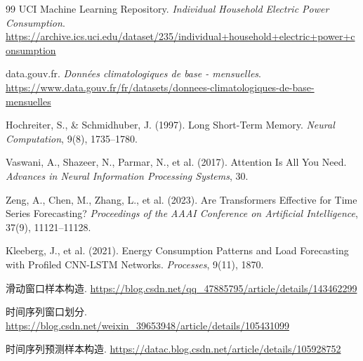 \documentclass[UTF8,a4paper,12pt]{ctexart}
\begin{document}
\begin{thebibliography}{99}
UCI Machine Learning Repository.
\textit{Individual Household Electric Power Consumption}.
\url{https://archive.ics.uci.edu/dataset/235/individual+household+electric+power+consumption}

data.gouv.fr.
\textit{Données climatologiques de base - mensuelles}.
\url{https://www.data.gouv.fr/fr/datasets/donnees-climatologiques-de-base-mensuelles}

Hochreiter, S., \& Schmidhuber, J. (1997).
Long Short-Term Memory.
\textit{Neural Computation}, 9(8), 1735--1780.

Vaswani, A., Shazeer, N., Parmar, N., et al. (2017).
Attention Is All You Need.
\textit{Advances in Neural Information Processing Systems}, 30.

Zeng, A., Chen, M., Zhang, L., et al. (2023).
Are Transformers Effective for Time Series Forecasting?
\textit{Proceedings of the AAAI Conference on Artificial Intelligence}, 37(9), 11121--11128.

Kleeberg, J., et al. (2021).
Energy Consumption Patterns and Load Forecasting with Profiled CNN-LSTM Networks.
\textit{Processes}, 9(11), 1870.

滑动窗口样本构造.
\url{https://blog.csdn.net/qq_47885795/article/details/143462299}

时间序列窗口划分.
\url{https://blog.csdn.net/weixin_39653948/article/details/105431099}

时间序列预测样本构造.
\url{https://datac.blog.csdn.net/article/details/105928752}

\end{thebibliography}
\end{document}
